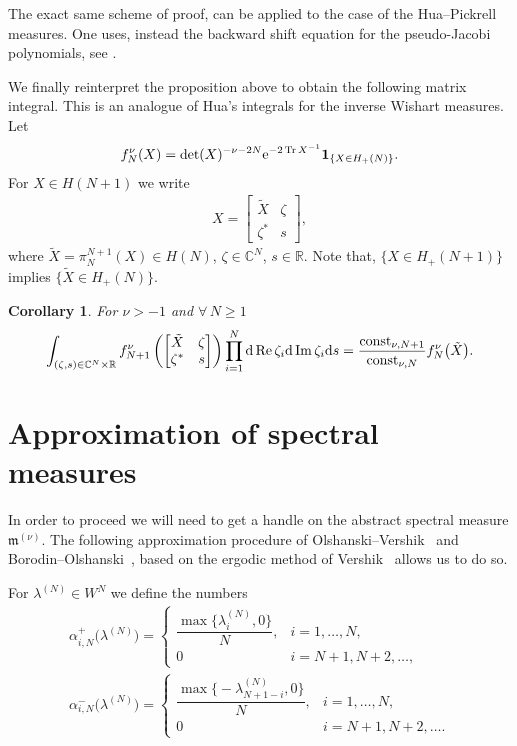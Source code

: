 \documentclass[pdftex]{sigma}
\numberwithin{equation}{section}
\newtheorem{Corollary}[Theorem]{Corollary}
\begin{document}
\begin{Remark}The exact same scheme of proof, can be applied to the case of the Hua--Pickrell measures. One uses, instead the backward shift equation for the pseudo-Jacobi polynomials, see \cite[Section~9.9]{HypergeometricOrthogonalPolynomials}.
\end{Remark}

We finally reinterpret the proposition above to obtain the following matrix integral. This is an analogue of Hua's integrals \cite{Hua,Neretin} for the inverse Wishart measures. Let
\begin{gather*}
f_{N}^{\nu}(X)=\det(X)^{-\nu-2N} {\rm e}^{-2\operatorname{Tr}X^{-1}}\mathbf{1}_{\{X \in H_+(N)\}}.
\end{gather*}
For $X\in H(N+1)$ we write
\begin{gather*}
X=\begin{bmatrix}
\tilde{X} & \zeta \\
\zeta^* & s
\end{bmatrix},
\end{gather*}
where $\tilde{X}=\pi_N^{N+1}(X) \in H(N)$, $\zeta \in \mathbb{C}^{N}$, $s \in \mathbb{R}$. Note that, $\{X \in H_+(N+1)\}$ implies $\{\tilde{X} \in H_+(N)\}$.
\begin{Corollary}
For $\nu>-1$ and $\forall\, N \ge 1$
\begin{gather*}
\int_{(\zeta,s)\in \mathbb{C}^N\times \mathbb{R}}^{}f_{N+1}^{\nu}\left(\begin{bmatrix}
\tilde{X} & \zeta \\
\zeta^* & s
\end{bmatrix}\right)\prod_{i=1}^{N}{\rm d} \operatorname{Re} \zeta_i {\rm d}\operatorname{Im} \zeta_i {\rm d}s=\frac{\operatorname{const}_{\nu, N+1}}{\operatorname{const}_{\nu, N}}f_{N}^{\nu}\big(\tilde{X}\big).
\end{gather*}
\end{Corollary}

\section{Approximation of spectral measures}\label{section3}
In order to proceed we will need to get a handle on the abstract spectral measure $\mathfrak{m}^{(\nu)}$. The following approximation procedure of Olshanski--Vershik~\cite{OlshanskiVershik} and Borodin--Olshanski~\cite{BorodinOlshanskiErgodic}, based on the ergodic method of Vershik~\cite{VershikErgodic} allows us to do so.

For $\lambda^{(N)} \in W^N$ we define the numbers
\begin{gather*}
\alpha_{i,N}^+\big(\lambda^{(N)}\big) =\begin{cases}
\dfrac{\max\big\{\lambda^{(N)}_{i},0\big\}}{N},& i=1,\dots, N,\\
0 & i=N+1,N+2,\dots,
\end{cases} \\
\alpha_{i,N}^-\big(\lambda^{(N)}\big) =\begin{cases}
\dfrac{\max\big\{{-}\lambda^{(N)}_{N+1-i},0\big\}}{N}, & i=1,\dots, N,\\
0 & i=N+1,N+2,\dots.
\end{cases}
\end{gather*}
\end{document}
